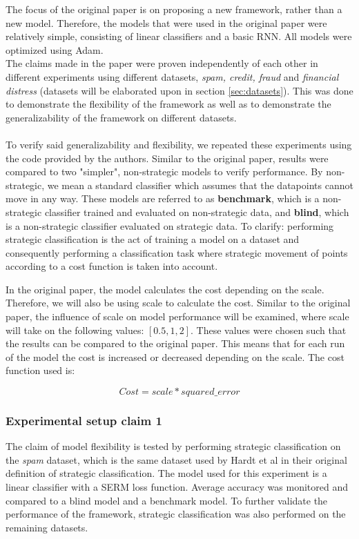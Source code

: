 The focus of the original paper is on proposing a new framework, rather than a new model. Therefore, the models that were used in the original paper were relatively simple, consisting of linear classifiers and a basic RNN. All models were optimized using Adam.\\ 
The claims made in the paper were proven independently of each other in different experiments using different datasets, \textit{spam, credit, fraud} and \textit{financial distress} (datasets will be elaborated upon in section \ref{sec:datasets}). This was done to demonstrate the flexibility of the framework as well as to demonstrate the generalizability of the framework on different datasets.\\\\ To verify said generalizability and flexibility, we repeated these experiments using the code provided by the authors. Similar to the original paper, results were compared to two "simpler", non-strategic models to verify performance. By non-strategic, we mean a standard classifier which assumes that the datapoints cannot move in any way. These models are referred to as \textbf{benchmark}, which is a non-strategic classifier trained and evaluated on non-strategic data, and \textbf{blind}, which is a non-strategic classifier evaluated on strategic data. To clarify: performing strategic classification is the act of training a model on a dataset and consequently performing a classification task where strategic movement of points according to a cost function is taken into account.

In the original paper, the model calculates the cost depending on the scale. Therefore, we will also be using scale to calculate the cost. Similar to the original paper, the influence of scale on model performance will be examined, where scale will take on the following values: $[0.5, 1, 2]$. These values were chosen such that the results can be compared to the original paper. This means that for each run of the model the cost is increased or decreased depending on the scale. The cost function used is:

\begin{equation}\label{eq:r_util}
     Cost = scale * squared\_error
\end{equation}

\subsubsection{Experimental setup claim 1}
The claim of model flexibility is tested by performing strategic classification on the \textit{spam} dataset, which is the same dataset used by Hardt et al\cite{hardt2016strategic} in their original definition of strategic classification. The model used for this experiment is a linear classifier with a SERM loss function. Average accuracy was monitored and compared to a blind model and a benchmark model. To further validate the performance of the framework, strategic classification was also performed on the remaining datasets.

